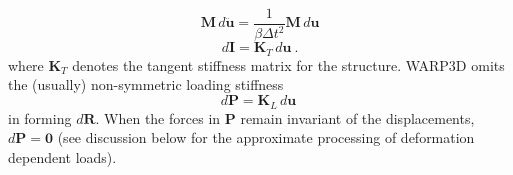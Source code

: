 \documentclass[11pt]{report}
\numberwithin{equation}{section}
\begin{document}
%
\begin{equation}\label{E:R4}
\mathbf{M}\,d\ddot{\bm{u}} =\frac{1}{\beta \Delta t^2} \mathbf{M}\, d \bm{u}
\end{equation}
%
%
\begin{equation}\label{E:R5}
d\bm{I} = \mathbf{K}_T \,d \bm{u}\ .
\end{equation}
%
\noindent where $\mathbf{K}_T$ denotes the tangent stiffness matrix for the structure. WARP3D 
omits the (usually) non-symmetric loading stiffness
%
\begin{equation}\label{E:R5}
d\bm{P} = \mathbf{K}_L \,d \bm{u}\ 
\end{equation}
in forming $d\bm{R}$. When the forces in  $\bm{P}$ remain invariant of the displacements,
$ d\bm{P}=\bm{0}$ (see discussion below for the approximate 
processing of  deformation dependent loads). 
\end{document}
